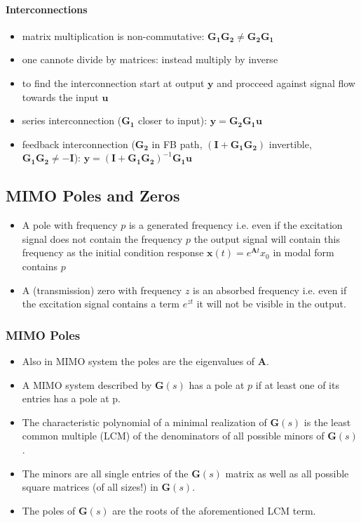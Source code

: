 \paragraph{Interconnections}

\begin{itemize}
    \item matrix multiplication is non-commutative: $\mathbf{G_1G_2} \ne \mathbf{G_2G_1}$
    \item one cannote divide by matrices: instead multiply by inverse
    \item to find the interconnection start at output $\mathbf{y}$ and procceed against signal flow towards the input $\mathbf{u}$
    \item series interconnection ($\mathbf{G_1}$ closer to input): $\mathbf{y}=\mathbf{G_2G_1u}$
    \item feedback interconnection ($\mathbf{G_2}$ in FB path, $(\mathbf{I}+\mathbf{G_1G_2})$ invertible, $\mathbf{G_1G_2}\ne -\mathbf{I}$): $\mathbf{y}={(\mathbf{I}+\mathbf{G_1G_2})}^{-1}\mathbf{G_1u}$
\end{itemize}
\subsection{MIMO Poles and Zeros}


\begin{itemize}
    \item A pole with frequency $p$ is a generated frequency i.e. even if the excitation signal does not contain the frequency $p$ the output signal will contain this frequency as the initial condition response $\mathbf{x}(t)=e^{\mathbf{A}t}x_0$ in modal form contains $p$
    \item A (transmission) zero with frequency $z$ is an absorbed frequency i.e. even if the excitation signal contains a term $e^{zt}$ it will not be visible in the output.
\end{itemize}

\subsubsection{MIMO Poles}
\begin{itemize}
    \item Also in MIMO system the poles are the eigenvalues of $\mathbf{A}$.
    \item A MIMO system described by $\mathbf{G}(s)$ has a pole at $p$ if at least one of its entries has a pole at p.
    \item The characteristic polynomial of a minimal realization of $\mathbf{G}(s)$ is the least common multiple (LCM) of the denominators of all possible minors of $\mathbf{G}(s)$.
    \item The minors are all single entries of the $\mathbf{G}(s)$ matrix as well as all possible square matrices (of all sizes!) in $\mathbf{G}(s)$.
    \item The poles of $\mathbf{G}(s)$ are the roots of the aforementioned LCM term.
\end{itemize}



